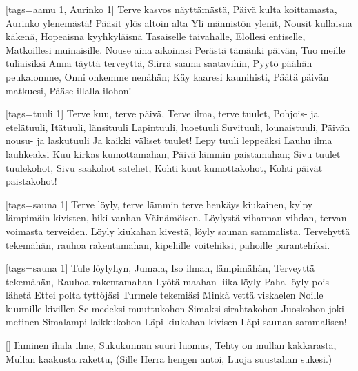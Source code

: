 [tags={aamu 1, Aurinko 1}]
  \beginverse
    Terve kasvos näyttämästä,
    Päivä kulta koittamasta,
    Aurinko ylenemästä!
    Pääsit ylös altoin alta
    Yli männistön ylenit,
    Nousit kullaisna käkenä,
    Hopeaisna kyyhkyläisnä
    Tasaiselle taivahalle,
    Elollesi entiselle,
    Matkoillesi muinaisille.
  \endverse
  \beginverse
    Nouse aina aikoinasi
    Perästä tämänki päivän,
    Tuo meille tuliaisiksi
    Anna täyttä terveyttä,
    Siirrä saama saatavihin,
    Pyytö päähän peukalomme,
    Onni onkemme nenähän;
    Käy kaaresi kaunihisti,
    Päätä päivän matkuesi,
    Pääse illalla ilohon!
  \endverse
\endsong


[tags={tuuli 1}]
  \beginverse
    Terve kuu, terve päivä,
    Terve ilma, terve tuulet,
    Pohjois- ja etelätuuli,
    Itätuuli, länsituuli
    Lapintuuli, luoetuuli
    Suvituuli, lounaistuuli,
    Päivän nousu- ja laskutuuli
    Ja kaikki väliset tuulet!
    Lepy tuuli leppeäksi
    Lauhu ilma lauhkeaksi
    Kuu kirkas kumottamahan,
    Päivä lämmin paistamahan;
    Sivu tuulet tuulekohot,
    Sivu saakohot satehet,
    Kohti kuut kumottakohot,
    Kohti päivät paistakohot!
  \endverse
\endsong


[tags={sauna 1}]
  \beginverse
    Terve löyly, terve lämmin
    terve henkäys kiukainen,
    kylpy lämpimäin kivisten,
    hiki vanhan Väinämöisen.
    Löylystä vihannan vihdan,
    tervan voimasta terveiden.
  \endverse
  \beginverse
    Löyly kiukahan kivestä,
    löyly saunan sammalista.
    Tervehyttä tekemähän,
    rauhoa rakentamahan,
    kipehille voitehiksi,
    pahoille parantehiksi.
  \endverse
\endsong


[tags={sauna 1}]
  \beginverse
    Tule löylyhyn, Jumala,
    Iso ilman, lämpimähän,
    Terveyttä tekemähän,
    Rauhoa rakentamahan
  \endverse
  \beginverse
    Lyötä maahan liika löyly
    Paha löyly pois lähetä
    Ettei polta tyttöjäsi
    Turmele tekemiäsi
  \endverse
  \beginverse
    Minkä vettä viskaelen
    Noille kuumille kivillen
    Se medeksi muuttukohon
    Simaksi sirahtakohon
  \endverse
  \beginverse
    Juoskohon joki metinen
    Simalampi laikkukohon
    Läpi kiukahan kivisen
    Läpi saunan sammalisen!
  \endverse
\endsong


[]
  \beginverse
    Ihminen ihala ilme,
    Sukukunnan suuri luomus,
    Tehty on mullan kakkarasta,
    Mullan kaakusta rakettu,
    (Sille Herra hengen antoi,
    Luoja suustahan sukesi.)
  \endverse
\endsong


